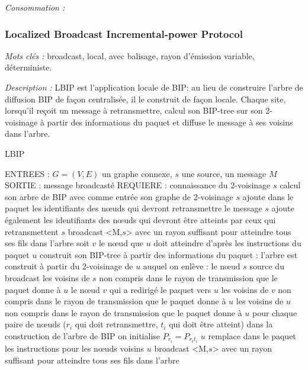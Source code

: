 \emph{Consommation :} 




\subsubsection{Localized Broadcast Incremental-power Protocol \cite{Ingelrest2004}}
\emph{Mots clés :} broadcast, local, avec balisage, rayon d'émission variable, déterministe.

\emph{Description :} LBIP est l'application locale de BIP: au lieu de construire l'arbre de diffusion BIP de façon centralisée, il le construit de façon locale.
Chaque site, lorsqu'il reçoit un message à retransmettre, calcul son BIP-tree sur son 2-voisinage à partir des informations du paquet et diffuse le message à ses voisins dans l'arbre.


\begin{algorithm}[H]
\caption{LBIP}
\label{algo_LBIP}
\begin{algorithmic}
\STATE ENTREES : $G=(V,E)$ un graphe connexe, $s$ une source, un message $M$
\STATE SORTIE : message broadcasté
\STATE REQUIERE : connaissance du 2-voisinage
\STATE $s$ calcul son arbre de BIP avec comme entrée son graphe de 2-voisinage
\STATE $s$ ajoute dans le paquet les identifiants des nœuds qui devront retransmettre le message
\STATE $s$ ajoute également les identifiants des nœuds qui devront être atteints par ceux qui retransmettent
\STATE $s$ broadcast <M,$s$> avec un rayon suffisant pour atteindre tous ses fils dans l'arbre
		\STATE soit $v$ le nœud que $u$ doit atteindre d'après les instructions du paquet
		\STATE $u$ construit son BIP-tree à partir des informations du paquet :
			 \INDSTATE l'arbre est construit à partir du 2-voisinage de $u$ auquel on enlève :
			 	 \INDSTATE[2]le nœud $s$ source du broadcast
				 \INDSTATE[2]les voisins de $s$ non compris dans le rayon de transmission que le paquet donne à $u$
				 \INDSTATE[2]le nœud $v$ qui a redirigé le paquet vers $u$
				 \INDSTATE[2]les voisins de $v$ non compris dans le rayon de transmission que le paquet donne à $u$
				\INDSTATE[2]les voisins de $u$ non compris dans le rayon de transmission que le paquet donne à $u$
			\INDSTATE[1] pour chaque paire de nœuds ($r_i$ qui doit retransmettre, $t_i$ qui doit être atteint)
				\INDSTATE[2] dans la construction de l'arbre de BIP on initialise $P_{r_i} = P_{r_i t_i}$
			\INDSTATE[1] $u$ remplace dans le paquet les instructions pour les nœuds voisins
			\INDSTATE[1] $u$ broadcast <M,$s$> avec un rayon suffisant pour atteindre tous ses fils dans l'arbre
	\ENDIF
\ENDIF
\end{algorithmic}
\end{algorithm}

